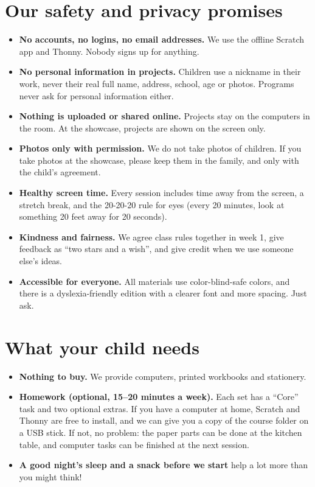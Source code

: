 \documentclass[level=1]{kidscode}
\begin{document}
\section{Our safety and privacy promises}
\begin{safety}
\begin{itemize}[itemsep=2pt]
  \item \textbf{No accounts, no logins, no email addresses.} We use the offline Scratch app and Thonny.
        Nobody signs up for anything.
  \item \textbf{No personal information in projects.} Children use a nickname in their work, never their
        real full name, address, school, age or photos. Programs never ask for personal information either.
  \item \textbf{Nothing is uploaded or shared online.} Projects stay on the computers in the room. At the
        showcase, projects are shown on the screen only.
  \item \textbf{Photos only with permission.} We do not take photos of children. If you take photos at
        the showcase, please keep them in the family, and only with the child's agreement.
  \item \textbf{Healthy screen time.} Every session includes time away from the screen, a stretch break,
        and the 20-20-20 rule for eyes (every 20 minutes, look at something 20 feet away for 20 seconds).
  \item \textbf{Kindness and fairness.} We agree class rules together in week 1, give feedback as
        \enquote{two stars and a wish}, and give credit when we use someone else's ideas.
  \item \textbf{Accessible for everyone.} All materials use color-blind-safe colors, and there is a
        dyslexia-friendly edition with a clearer font and more spacing. Just ask.
\end{itemize}
\end{safety}

\section{What your child needs}
\begin{itemize}[itemsep=2pt]
  \item \textbf{Nothing to buy.} We provide computers, printed workbooks and stationery.
  \item \textbf{Homework (optional, 15--20 minutes a week).} Each set has a \enquote{Core} task and two
        optional extras. If you have a computer at home, Scratch and Thonny are free to install, and we can
        give you a copy of the course folder on a USB stick. If not, no problem: the paper parts can be done
        at the kitchen table, and computer tasks can be finished at the next session.
  \item \textbf{A good night's sleep and a snack before we start} help a lot more than you might think!
\end{itemize}
\end{document}
